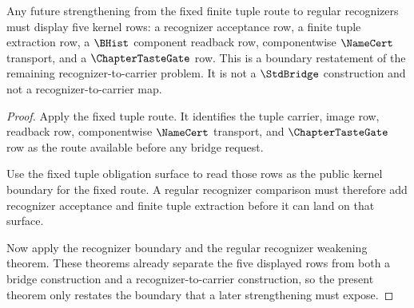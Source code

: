 \begin{theorem}
\label{thm:finite-bhist-injection-recognizer-restatement}
Any future strengthening from the fixed finite tuple route to regular recognizers must display five kernel rows: a recognizer acceptance row, a finite tuple extraction row, a $\BHist$ component readback row, componentwise $\NameCert$ transport, and a $\ChapterTasteGate$ row. This is a boundary restatement of the remaining recognizer-to-carrier problem. It is not a $\StdBridge$ construction and not a recognizer-to-carrier map.
\end{theorem}
\begin{proof}
Apply the fixed tuple route. It identifies the tuple carrier, image row, readback row, componentwise $\NameCert$ transport, and $\ChapterTasteGate$ row as the route available before any bridge request.

Use the fixed tuple obligation surface to read those rows as the public kernel boundary for the fixed route. A regular recognizer comparison must therefore add recognizer acceptance and finite tuple extraction before it can land on that surface.

Now apply the recognizer boundary and the regular recognizer weakening theorem. These theorems already separate the five displayed rows from both a bridge construction and a recognizer-to-carrier construction, so the present theorem only restates the boundary that a later strengthening must expose.
\end{proof}

